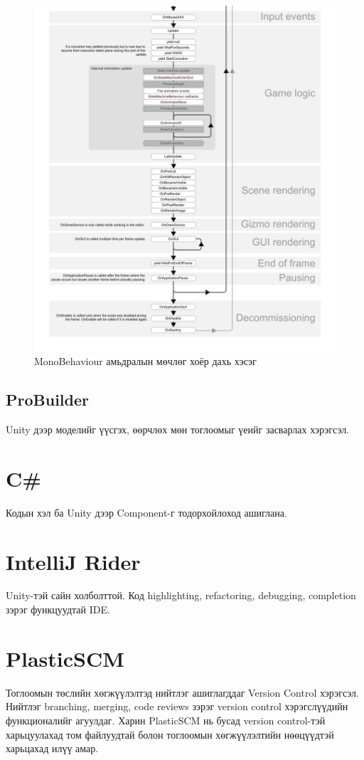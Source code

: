 \begin{figure}[b]
	\centering
	\includegraphics[width=\textwidth]{./images/monobehaviour_flowchart_2.png}
	\caption{MonoBehaviour амьдралын мөчлөг хоёр дахь хэсэг}
	\label{fig:MonoBehaviourFlowChart2}
\end{figure}


\subsection{ProBuilder}
Unity дээр моделийг үүсгэх, өөрчлөх мөн тоглоомыг үеийг засварлах хэрэгсэл.
\section{C\#}
Кодын хэл ба Unity дээр Component-г тодорхойлоход ашиглана.
\section{IntelliJ Rider}
Unity-тэй сайн холболттой. Код highlighting, refactoring, debugging, completion зэрэг функцуудтай IDE.
\section{PlasticSCM}
Тоглоомын төслийн хөгжүүлэлтэд нийтлэг ашиглагддаг Version Control хэрэгсэл. Нийтлэг branching, merging, code reviews зэрэг version control хэрэгслүүдийн функционалийг агуулдаг. Харин PlasticSCM нь бусад version control-тэй харьцуулахад том файлуудтай болон тоглоомын хөгжүүлэлтийн нөөцүүдтэй харьцахад илүү амар.
